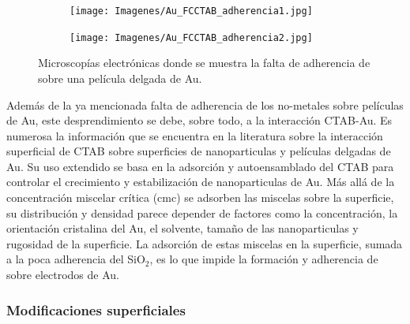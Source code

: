 				\begin{figure}[th]
		 	   	    \begin{subfigure}[t]{0.49\textwidth}
			        	\texttt{[image: Imagenes/Au\_FCCTAB\_adherencia1.jpg]}
			       		\end{subfigure}
					\begin{subfigure}[t]{0.49\textwidth}
			 	   	    \texttt{[image: Imagenes/Au\_FCCTAB\_adherencia2.jpg]}
			       		\end{subfigure}
					 \caption[Adherencia de CTAB sobre electrodos.]{Microscopías electrónicas donde se muestra la falta de adherencia de \pdmC \space sobre una película delgada de Au.}
					 \label{fig:CTAB_adherencia}	
				     \end{figure}
			Además de la ya mencionada falta de adherencia de los no-metales sobre películas de Au, este desprendimiento se debe, sobre todo, a la interacción CTAB-Au. Es numerosa la información que se encuentra en la literatura sobre la interacción superficial de CTAB sobre superficies de nanoparticulas y películas delgadas de Au\cite{Cheng2003,Smith2008,Lim2014,Meena2013,Wang2013,Hamon2009}. Su uso extendido se basa en la adsorción y autoensamblado del CTAB para controlar el crecimiento y estabilización de nanoparticulas de Au. Más allá de la concentración miscelar crítica (cmc) se adsorben las miscelas sobre la superficie, su distribución y densidad parece depender de factores como la concentración, la orientación cristalina del Au, el solvente, tamaño de las nanoparticulas y rugosidad de la superficie\cite{Meena2013,Lim2014}. La adsorción de estas miscelas en la superficie, sumada a la poca adherencia del SiO$_2$, es lo que impide la formación y adherencia de \pdmC\space sobre electrodos de Au.
		
							
		\subsubsection{Modificaciones superficiales}\label{sec:adherencia}

